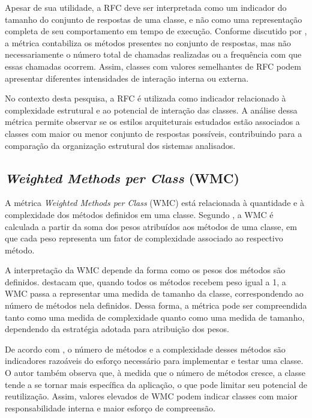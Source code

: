 Apesar de sua utilidade, a RFC deve ser interpretada como um indicador do tamanho do conjunto de respostas de uma classe, e 
não como uma representação completa de seu comportamento em tempo de execução. Conforme discutido por , 
a métrica contabiliza os métodos presentes no conjunto de respostas, mas não necessariamente o número total de chamadas 
realizadas ou a frequência com que essas chamadas ocorrem. Assim, classes com valores semelhantes de RFC podem apresentar 
diferentes intensidades de interação interna ou externa.

No contexto desta pesquisa, a RFC é utilizada como indicador relacionado à complexidade estrutural e ao potencial de interação 
das classes. A análise dessa métrica permite observar se os estilos arquiteturais estudados estão associados a classes com 
maior ou menor conjunto de respostas possíveis, contribuindo para a comparação da organização estrutural dos sistemas analisados.

\subsection{\textit{Weighted Methods per Class} (WMC)}
\label{sec:wmc}

A métrica \textit{Weighted Methods per Class} (WMC) está relacionada à quantidade e à complexidade dos métodos definidos em uma 
classe. Segundo , a WMC é calculada a partir da soma dos pesos atribuídos aos métodos de uma classe, 
em que cada peso representa um fator de complexidade associado ao respectivo método.

A interpretação da WMC depende da forma como os pesos dos métodos são definidos.  destacam que, quando 
todos os métodos recebem peso igual a 1, a WMC passa a representar uma medida de tamanho da classe, correspondendo ao número 
de métodos nela definidos. Dessa forma, a métrica pode ser compreendida tanto como uma medida de complexidade quanto como uma 
medida de tamanho, dependendo da estratégia adotada para atribuição dos pesos.

De acordo com , o número de métodos e a complexidade desses métodos são indicadores razoáveis do 
esforço necessário para implementar e testar uma classe. O autor também observa que, à medida que o número de métodos cresce, 
a classe tende a se tornar mais específica da aplicação, o que pode limitar seu potencial de reutilização. Assim, valores 
elevados de WMC podem indicar classes com maior responsabilidade interna e maior esforço de compreensão.

